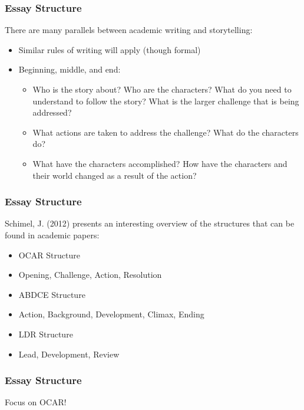 \begin{frame}
	\frametitle{Essay Structure}
	
	There are many parallels between academic writing and storytelling:
	
	\begin{itemize}
		\item Similar rules of writing will apply (though formal)
		\item Beginning, middle, and end:
		\begin{itemize}
			\item Who is the story about? Who are the characters? What do you need to understand to follow the story? What is the larger challenge that is being addressed?
			\item What actions are taken to address the challenge? What do the characters do?
			\item What have the characters accomplished? How have the characters and their world changed as a result of the action?
		\end{itemize}
	\end{itemize}
\end{frame}

\begin{frame}
	\frametitle{Essay Structure}
	
	Schimel, J. (2012) presents an interesting overview of the structures that can be found in academic papers:
	
	\begin{itemize}
		\item OCAR Structure
		\item Opening, Challenge, Action, Resolution

		\item ABDCE Structure
		\item Action, Background, Development, Climax, Ending
		
		\item LDR Structure
		\item Lead, Development, Review
	\end{itemize}
\end{frame}

\begin{frame}
	\frametitle{Essay Structure}
	
	Focus on OCAR!

\end{frame}



